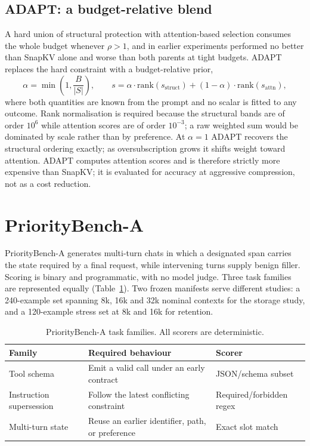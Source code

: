 \subsection{ADAPT: a budget-relative blend}
\label{sec:adapt-method}

A hard union of structural protection with attention-based selection consumes
the whole budget whenever $\rho>1$, and in earlier experiments performed no
better than SnapKV alone and worse than both parents at tight budgets.  ADAPT
replaces the hard constraint with a budget-relative prior,
\begin{equation}
  \alpha=\min\!\left(1,\frac{B}{|S|}\right),\qquad
  s=\alpha\cdot\mathrm{rank}(s_{\text{struct}})+(1-\alpha)\cdot
  \mathrm{rank}(s_{\text{attn}}),
  \label{eq:adapt}
\end{equation}
where both quantities are known from the prompt and no scalar is fitted to any
outcome.  Rank normalisation is required because the structural bands are of
order $10^{6}$ while attention scores are of order $10^{-3}$; a raw weighted sum
would be dominated by scale rather than by preference.  At $\alpha=1$ ADAPT
recovers the structural ordering exactly; as oversubscription grows it shifts
weight toward attention.  ADAPT computes attention scores and is therefore
strictly more expensive than SnapKV; it is evaluated for accuracy at aggressive
compression, not as a cost reduction.

\section{PriorityBench-A}
\label{sec:benchmark}

PriorityBench-A generates multi-turn chats in which a designated span carries
the state required by a final request, while intervening turns supply benign
filler.  Scoring is binary and programmatic, with no model judge.  Three task
families are represented equally (Table~\ref{tab:tasks}).  Two frozen manifests
serve different studies: a 240-example set spanning 8k, 16k and 32k nominal
contexts for the storage study, and a 120-example stress set at 8k and 16k for
retention.

\begin{table}[!htbp]
  \centering
  \caption{PriorityBench-A task families.  All scorers are deterministic.}
  \label{tab:tasks}
  \begin{tabular}{lll}
    \toprule
    Family & Required behaviour & Scorer \\
    \midrule
    Tool schema & Emit a valid call under an early contract & JSON/schema subset \\
    Instruction supersession & Follow the latest conflicting constraint & Required/forbidden regex \\
    Multi-turn state & Reuse an earlier identifier, path, or preference & Exact slot match \\
    \bottomrule
  \end{tabular}
\end{table}

